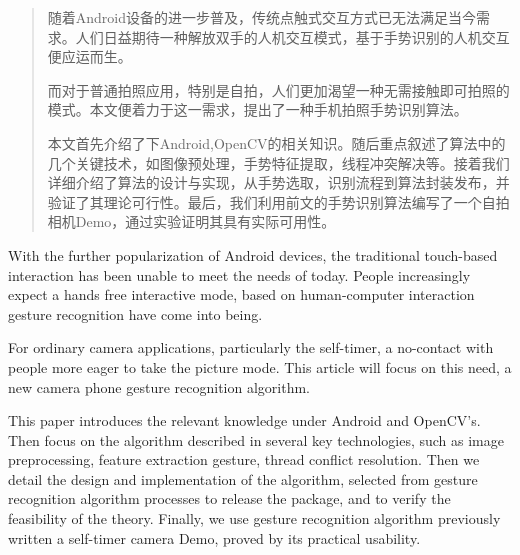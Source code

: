 \begin{abstract}
随着Android设备的进一步普及，传统点触式交互方式已无法满足当今需求。人们日益期待一种解放双手的人机交互模式，基于手势识别的人机交互便应运而生。

而对于普通拍照应用，特别是自拍，人们更加渴望一种无需接触即可拍照的模式。本文便着力于这一需求，提出了一种手机拍照手势识别算法。

本文首先介绍了下Android,OpenCV的相关知识。随后重点叙述了算法中的几个关键技术，如图像预处理，手势特征提取，线程冲突解决等。接着我们详细介绍了算法的设计与实现，从手势选取，识别流程到算法封装发布，并验证了其理论可行性。最后，我们利用前文的手势识别算法编写了一个自拍相机Demo，通过实验证明其具有实际可用性。

\end{abstract}
\begin{englishabstract}
With the further popularization of Android devices, the traditional touch-based interaction has been unable to meet the needs of today. People increasingly expect a hands free interactive mode, based on human-computer interaction gesture recognition have come into being.

For ordinary camera applications, particularly the self-timer, a no-contact with people more eager to take the picture mode. This article will focus on this need, a new camera phone gesture recognition algorithm.

This paper introduces the relevant knowledge under Android and OpenCV's. Then focus on the algorithm described in several key technologies, such as image preprocessing, feature extraction gesture, thread conflict resolution. Then we detail the design and implementation of the algorithm, selected from gesture recognition algorithm processes to release the package, and to verify the feasibility of the theory. Finally, we use gesture recognition algorithm previously written a self-timer camera Demo, proved by its practical usability.

\end{englishabstract}
